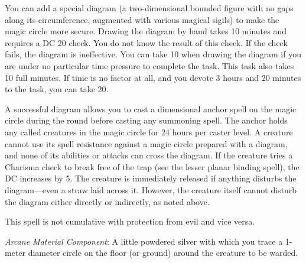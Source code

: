 {	You can add a special diagram (a two-dimensional bounded figure with no gaps along its circumference, augmented with various magical sigils) to make the magic circle more secure. Drawing the diagram by hand takes 10 minutes and requires a DC 20  check. You do not know the result of this check. If the check fails, the diagram is ineffective. You can take 10 when drawing the diagram if you are under no particular time pressure to complete the task. This task also takes 10 full minutes. If time is no factor at all, and you devote 3 hours and 20 minutes to the task, you can take 20.

	A successful diagram allows you to cast a dimensional anchor spell on the magic circle during the round before casting any summoning spell. The anchor holds any called creatures in the magic circle for 24 hours per caster level. A creature cannot use its spell resistance against a magic circle prepared with a diagram, and none of its abilities or attacks can cross the diagram. If the creature tries a Charisma check to break free of the trap (see the lesser planar binding spell), the DC increases by 5. The creature is immediately released if anything disturbs the diagram---even a straw laid across it. However, the creature itself cannot disturb the diagram either directly or indirectly, as noted above.

	This spell is not cumulative with protection from evil and vice versa.

	\textit{Arcane Material Component}:
	A little powdered silver with which you trace a 1-meter diameter circle on the floor (or ground) around the creature to be warded.

}
